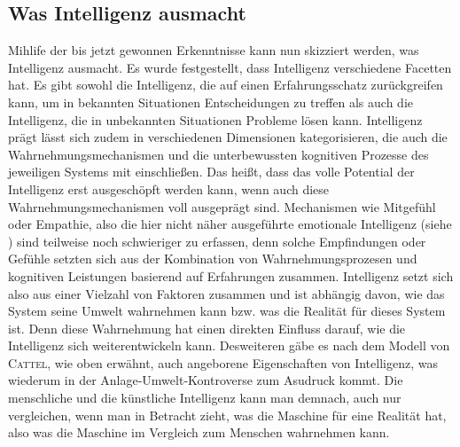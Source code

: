 \documentclass[a4paper, 11pt]{scrartcl}
\begin{document}
\subsection{Was Intelligenz ausmacht}
Mihlife der bis jetzt gewonnen Erkenntnisse kann nun skizziert werden, was Intelligenz ausmacht. Es wurde festgestellt, dass Intelligenz verschiedene Facetten hat. Es gibt sowohl die Intelligenz, die auf einen Erfahrungsschatz zurückgreifen kann, um in bekannten Situationen Entscheidungen zu treffen als auch die Intelligenz, die in unbekannten Situationen Probleme lösen kann. Intelligenz prägt lässt sich zudem in verschiedenen Dimensionen kategorisieren, die auch die Wahrnehmungsmechanismen und die unterbewussten kognitiven Prozesse des jeweiligen Systems mit einschließen. Das heißt, dass das volle Potential der Intelligenz erst ausgeschöpft werden kann, wenn auch diese Wahrnehmungsmechanismen voll ausgeprägt sind. Mechanismen wie Mitgefühl oder Empathie, also die hier nicht näher ausgeführte emotionale Intelligenz (siehe \cite{Mayer1990}) sind teilweise noch schwieriger zu erfassen, denn solche Empfindungen oder Gefühle setzten sich aus der Kombination von Wahrnehmungsprozesen und kognitiven Leistungen basierend auf Erfahrungen zusammen. Intelligenz setzt sich also aus einer Vielzahl von Faktoren zusammen und ist abhängig davon, wie das System seine Umwelt wahrnehmen kann bzw. was die Realität für dieses System ist. Denn diese Wahrnehmung hat einen direkten Einfluss darauf, wie die Intelligenz sich weiterentwickeln kann. Desweiteren gäbe es nach dem Modell von \textsc{Cattel}, wie oben erwähnt, auch angeborene Eigenschaften von Intelligenz, was wiederum in der Anlage-Umwelt-Kontroverse zum Asudruck kommt. Die menschliche und die künstliche Intelligenz kann man demnach, auch nur vergleichen, wenn man in Betracht zieht, was die Maschine für eine Realität hat, also was die Maschine im Vergleich zum Menschen wahrnehmen kann.
\end{document}
